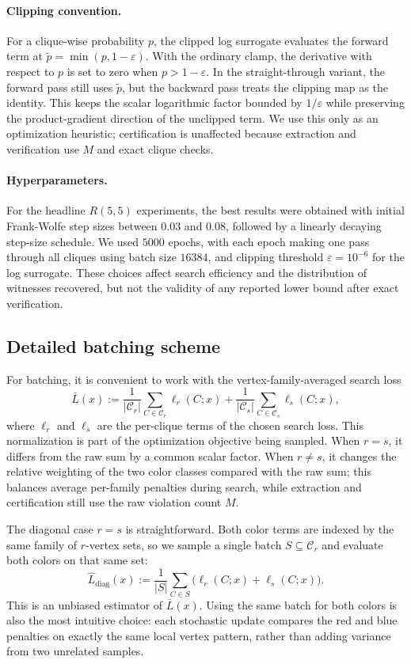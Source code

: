 \documentclass{article}
\begin{document}
\paragraph{Clipping convention.}
For a clique-wise probability $p$, the clipped log surrogate evaluates the forward term at $\tilde{p}=\min(p,1-\varepsilon)$. With the ordinary clamp, the derivative with respect to $p$ is set to zero when $p>1-\varepsilon$. In the straight-through variant, the forward pass still uses $\tilde{p}$, but the backward pass treats the clipping map as the identity. This keeps the scalar logarithmic factor bounded by $1/\varepsilon$ while preserving the product-gradient direction of the unclipped term. We use this only as an optimization heuristic; certification is unaffected because extraction and verification use $M$ and exact clique checks.

\paragraph{Hyperparameters.}
For the headline $R(5,5)$ experiments, the best results were obtained with initial Frank-Wolfe step sizes between $0.03$ and $0.08$, followed by a linearly decaying step-size schedule. We used $5000$ epochs, with each epoch making one pass through all cliques using batch size $16384$, and clipping threshold $\varepsilon=10^{-6}$ for the log surrogate. These choices affect search efficiency and the distribution of witnesses recovered, but not the validity of any reported lower bound after exact verification.

\subsection{Detailed batching scheme}

For batching, it is convenient to work with the vertex-family-averaged search loss
\[
\bar{L}(x)
:=
\frac{1}{|\mathcal{C}_r|}
\sum_{C \in \mathcal{C}_r} \ell_r(C;x)
+
\frac{1}{|\mathcal{C}_s|}
\sum_{C \in \mathcal{C}_s} \ell_s(C;x),
\]
where $\ell_r$ and $\ell_s$ are the per-clique terms of the chosen search loss. This normalization is part of the optimization objective being sampled. When $r=s$, it differs from the raw sum by a common scalar factor. When $r\neq s$, it changes the relative weighting of the two color classes compared with the raw sum; this balances average per-family penalties during search, while extraction and certification still use the raw violation count $M$.

The diagonal case $r=s$ is straightforward. Both color terms are indexed by the same family of $r$-vertex sets, so we sample a single batch $S \subseteq \mathcal{C}_r$ and evaluate both colors on that same set:
\[
\widehat{L}_{\mathrm{diag}}(x)
:=
\frac{1}{|S|}
\sum_{C \in S} \bigl(\ell_r(C;x) + \ell_s(C;x)\bigr).
\]
This is an unbiased estimator of $\bar{L}(x)$. Using the same batch for both colors is also the most intuitive choice: each stochastic update compares the red and blue penalties on exactly the same local vertex pattern, rather than adding variance from two unrelated samples.
\end{document}
